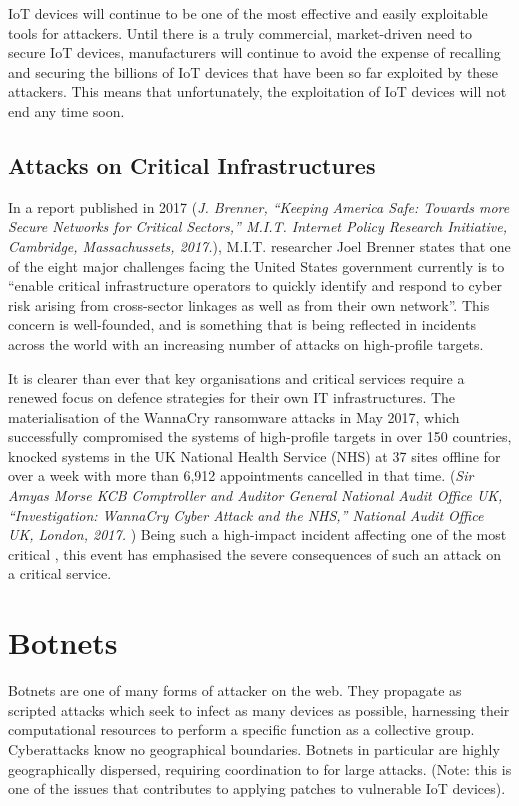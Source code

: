 	IoT devices will continue to be one of the most effective and easily exploitable tools for attackers. Until there is a truly commercial, market-driven need to secure IoT devices, manufacturers will continue to avoid the expense of recalling and securing the billions of IoT devices that have been so far exploited by these attackers. This means that unfortunately, the exploitation of IoT devices will
	not end any time soon.
	
	\subsection{Attacks on Critical Infrastructures}
	
	In a report published in 2017 (\textit{J. Brenner, “Keeping America Safe: Towards more Secure Networks for Critical Sectors,” M.I.T. Internet Policy Research Initiative, Cambridge, Massachussets, 2017.}), M.I.T. researcher Joel Brenner states that one of the eight major challenges facing the United States government currently is to “enable critical infrastructure operators to quickly identify and respond to cyber risk arising from cross-sector linkages as well as from their own network”. This concern is well-founded, and is something that is being reflected in incidents across the world with an increasing number of attacks on high-profile targets.
	
	It is clearer than ever that key organisations and critical services require a renewed focus on defence strategies for their own IT infrastructures. The materialisation of the WannaCry ransomware attacks in May 2017, which successfully compromised the systems of high-profile targets in over 150 countries, knocked systems in the UK National Health Service (NHS) at 37 sites offline for over a week with more than 6,912 appointments cancelled in that time. (\textit{Sir Amyas Morse KCB Comptroller and Auditor General National Audit Office UK, “Investigation: WannaCry Cyber Attack and the NHS,” National Audit Office UK, London, 2017.
}) Being such a high-impact incident affecting one of the most critical , this event has emphasised the severe consequences of such an attack on a critical service.

	


\section{Botnets}

Botnets are one of many forms of attacker on the web. They propagate as scripted attacks which seek to infect as many devices as possible, harnessing their computational resources to perform a specific function as a collective group. Cyberattacks know no geographical boundaries. Botnets in particular are highly geographically dispersed, requiring coordination to for large attacks. (Note: this is one of the issues that contributes to applying patches to vulnerable IoT devices).

